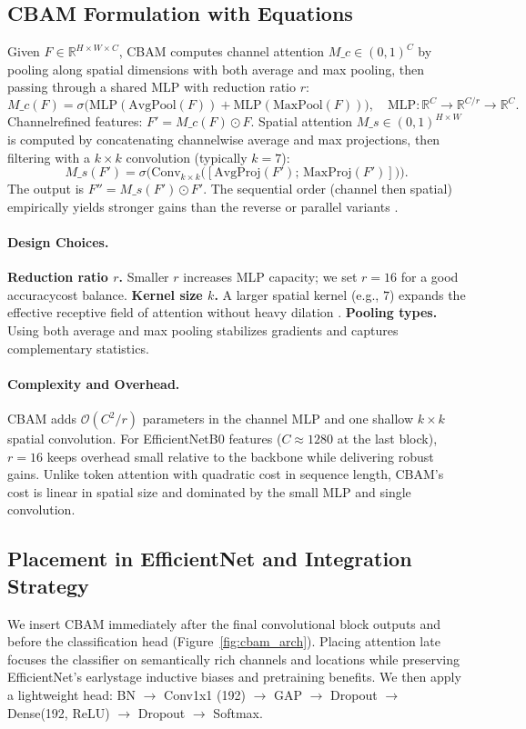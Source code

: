 \subsection{CBAM Formulation with Equations}
Given $F\in\mathbb{R}^{H\times W\times C}$, CBAM computes channel attention $M\_c\in(0,1)^C$ by pooling along spatial dimensions with both average and max pooling, then passing through a shared MLP with reduction ratio $r$:
\[ M\_c(F) = \sigma\big( \mathrm{MLP}(\mathrm{AvgPool}(F)) + \mathrm{MLP}(\mathrm{MaxPool}(F)) \big), \quad \mathrm{MLP}: \mathbb{R}^{C} \to \mathbb{R}^{C/r} \to \mathbb{R}^{C}. \]
Channel\textendash refined features: $F' = M\_c(F) \odot F$. Spatial attention $M\_s\in(0,1)^{H\times W}$ is computed by concatenating channel\textendash wise average and max projections, then filtering with a $k\times k$ convolution (typically $k{=}7$):
\[ M\_s(F') = \sigma\Big( \mathrm{Conv}_{k\times k}\big([\mathrm{AvgProj}(F');\,\mathrm{MaxProj}(F')]\big) \Big). \]
The output is $F'' = M\_s(F') \odot F'$. The sequential order (channel then spatial) empirically yields stronger gains than the reverse or parallel variants \cite{woo2018cbam}.

\paragraph{Design Choices.}
\textbf{Reduction ratio $r$.} Smaller $r$ increases MLP capacity; we set $r{=}16$ for a good accuracy\textendash cost balance. \textbf{Kernel size $k$.} A larger spatial kernel (e.g., $7$) expands the effective receptive field of attention without heavy dilation \cite{cbamMedium}. \textbf{Pooling types.} Using both average and max pooling stabilizes gradients and captures complementary statistics.

\paragraph{Complexity and Overhead.}
CBAM adds $\mathcal{O}(C^2/r)$ parameters in the channel MLP and one shallow $k\times k$ spatial convolution. For EfficientNetB0 features ($C\approx 1280$ at the last block), $r{=}16$ keeps overhead small relative to the backbone while delivering robust gains. Unlike token attention with quadratic cost in sequence length, CBAM's cost is linear in spatial size and dominated by the small MLP and single convolution.

\subsection{Placement in EfficientNet and Integration Strategy}
We insert CBAM immediately after the final convolutional block outputs and before the classification head (Figure~\ref{fig:cbam_arch}). Placing attention late focuses the classifier on semantically rich channels and locations while preserving EfficientNet's early\textendash stage inductive biases and pretraining benefits. We then apply a lightweight head: BN $\rightarrow$ Conv1x1 (192) $\rightarrow$ GAP $\rightarrow$ Dropout $\rightarrow$ Dense(192, ReLU) $\rightarrow$ Dropout $\rightarrow$ Softmax.

